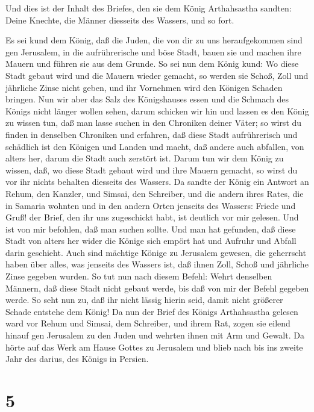  Und dies ist der Inhalt des Briefes, den sie dem König
Arthahsastha sandten: Deine Knechte, die Männer diesseits des Wassers,
und so fort.

 Es sei kund dem König, daß die Juden, die von dir zu uns
heraufgekommen sind gen Jerusalem, in die aufrührerische und böse Stadt,
bauen sie und machen ihre Mauern und führen sie aus dem Grunde.
 So sei nun dem König kund: Wo diese Stadt gebaut wird und
die Mauern wieder gemacht, so werden sie Schoß, Zoll und jährliche Zinse
nicht geben, und ihr Vornehmen wird den Königen Schaden bringen.
 Nun wir aber das Salz des Königshauses essen und die
Schmach des Königs nicht länger wollen sehen, darum schicken wir hin und
lassen es den König zu wissen tun,  daß man lasse suchen in
den Chroniken deiner Väter; so wirst du finden in denselben Chroniken
und erfahren, daß diese Stadt aufrührerisch und schädlich ist den
Königen und Landen und macht, daß andere auch abfallen, von alters her,
darum die Stadt auch zerstört ist.  Darum tun wir dem König
zu wissen, daß, wo diese Stadt gebaut wird und ihre Mauern gemacht, so
wirst du vor ihr nichts behalten diesseits des Wassers.  Da
sandte der König ein Antwort an Rehum, den Kanzler, und Simsai, den
Schreiber, und die andern ihres Rates, die in Samaria wohnten und in den
andern Orten jenseits des Wassers: Friede und Gruß!  der
Brief, den ihr uns zugeschickt habt, ist deutlich vor mir gelesen.
 Und ist von mir befohlen, daß man suchen sollte. Und man
hat gefunden, daß diese Stadt von alters her wider die Könige sich
empört hat und Aufruhr und Abfall darin geschieht.  Auch
sind mächtige Könige zu Jerusalem gewesen, die geherrscht haben über
alles, was jenseits des Wassers ist, daß ihnen Zoll, Schoß und jährliche
Zinse gegeben wurden.  So tut nun nach diesem Befehl: Wehrt
denselben Männern, daß diese Stadt nicht gebaut werde, bis daß von mir
der Befehl gegeben werde.  So seht nun zu, daß ihr nicht
lässig hierin seid, damit nicht größerer Schade entstehe dem König!
 Da nun der Brief des Königs Arthahsastha gelesen ward vor
Rehum und Simsai, dem Schreiber, und ihrem Rat, zogen sie eilend hinauf
gen Jerusalem zu den Juden und wehrten ihnen mit Arm und Gewalt.
 Da hörte auf das Werk am Hause Gottes zu Jerusalem und
blieb nach bis ins zweite Jahr des darius, des Königs in Persien.

\hypertarget{section-4}{%
\section{5}\label{section-4}}

